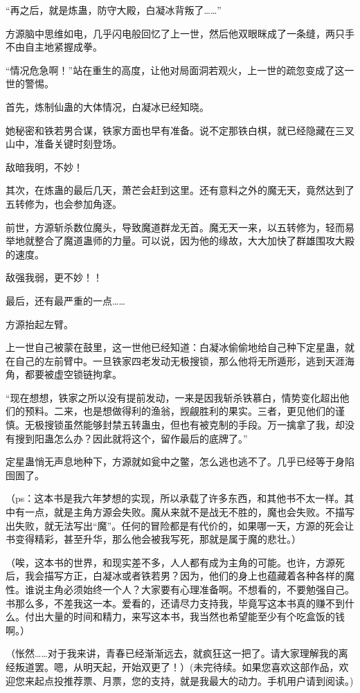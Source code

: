 \begin{this_body}
“再之后，就是炼蛊，防守大殿，白凝冰背叛了……”

方源脑中思维如电，几乎闪电般回忆了上一世，然后他双眼眯成了一条缝，两只手不由自主地紧握成拳。

“情况危急啊！”站在重生的高度，让他对局面洞若观火，上一世的疏忽变成了这一世的警惕。

首先，炼制仙蛊的大体情况，白凝冰已经知晓。

她秘密和铁若男合谋，铁家方面也早有准备。说不定那铁白棋，就已经隐藏在三叉山中，准备关键时刻登场。

敌暗我明，不妙！

其次，在炼蛊的最后几天，萧芒会赶到这里。还有意料之外的魔无天，竟然达到了五转修为，也会参加角逐。

前世，方源斩杀数位魔头，导致魔道群龙无首。魔无天一来，以五转修为，轻而易举地就整合了魔道蛊师的力量。可以说，因为他的缘故，大大加快了群雄围攻大殿的速度。

敌强我弱，更不妙！！

最后，还有最严重的一点……

方源抬起左臂。

上一世自己被蒙在鼓里，这一世他已经知道：白凝冰偷偷地给自己种下定星蛊，就在自己的左前臂中。一旦铁家四老发动无极搜锁，那么他将无所遁形，逃到天涯海角，都要被虚空锁链拘拿。

“现在想想，铁家之所以没有提前发动，一来是因我斩杀铁慕白，情势变化超出他们的预料。二来，也是想做得利的渔翁，觊觎胜利的果实。三者，更见他们的谨慎。无极搜锁虽然能够封禁五转蛊虫，但也有被克制的手段。万一擒拿了我，却没有搜到阳蛊怎么办？因此就将这个，留作最后的底牌了。”

定星蛊悄无声息地种下，方源就如瓮中之鳖，怎么逃也逃不了。几乎已经等于身陷囹圄了。

（ps：这本书是我六年梦想的实现，所以承载了许多东西，和其他书不太一样。其中有一点，就是主角方源会失败。魔从来就不是战无不胜的，魔也会失败。不描写出失败，就无法写出“魔”。任何的冒险都是有代价的，如果哪一天，方源的死会让书变得精彩，甚至升华，那么他会被我写死，那就是属于魔的悲壮。）

（唉，这本书的世界，和现实差不多，人人都有成为主角的可能。也许，方源死后，我会描写方正，白凝冰或者铁若男？因为，他们的身上也蕴藏着各种各样的魔性。谁说主角必须始终一个人？大家要有心理准备啊。不想看的，不要勉强自己。书那么多，不差我这一本。爱看的，还请尽力支持我，毕竟写这本书真的赚不到什么。付出大量的时间和精力，来写这本书，我当然也希望能至少有个吃盒饭的钱啊。）

（怅然……对于我来讲，青春已经渐渐远去，就疯狂这一把了。请大家理解我的离经叛道罢。嗯，从明天起，开始双更了！）(未完待续。如果您喜欢这部作品，欢迎您来起点投推荐票、月票，您的支持，就是我最大的动力。手机用户请到阅读。)

\end{this_body}


